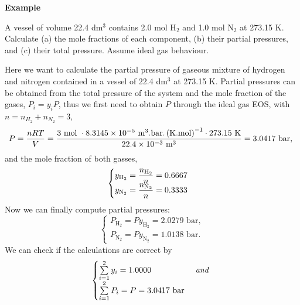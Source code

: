    \begin{MyExample}{\begin{center}{\bf Example}\end{center}}
     \begin{example}\label{Chapter:Intro_Property_of_Gases:Example5}
       \citep{Atkins_Book} A vessel of volume 22.4 dm$^{3}$ contains 2.0 mol H$_{2}$ and 1.0 mol N$_{2}$ at 273.15 K. Calculate (a) the mole fractions of each component, (b) their partial pressures, and (c) their total pressure. Assume ideal gas behaviour.
     \end{example}

        Here we want to calculate the partial pressure of gaseous mixture of hydrogen and nitrogen contained in a vessel of 22.4 dm$^{3}$ at 273.15 K. Partial pressures can be obtained from the total pressure of the system and the mole fraction of the gases, $P_{i}=y_{i}P$, thus we first need to obtain $P$ through the ideal gas EOS, with $n=n_{H_{2}}+n_{N_{2}}=3$,
      \begin{displaymath}
        P = \frc{n R T }{V} = \frc{3\text{ mol } \cdot 8.3145\times 10^{-5}\text{ m}^{3}\text{.bar.}\left(\text{K.mol}\right)^{-1}\cdot 273.15\text{ K}}{22.4\times 10^{-3}\text{ m}^{3}} = 3.0417\text{ bar, }
      \end{displaymath}
      and the mole fraction of both gasses,
       \begin{displaymath}
         \begin{cases}
           y_{\text{H}_{2}} = \frc{n_{\text{H}_{2}}}{n} = 0.6667  \\
           y_{\text{N}_{2}} = \frc{n_{\text{N}_{2}}}{n} = 0.3333  
         \end{cases}
       \end{displaymath}
       Now we can finally compute partial pressures:
       \begin{displaymath}
         \begin{cases}
           P_{\text{H}_{2}} = Py_{\text{H}_{2}} = 2.0279\text{ bar},  \\
           P_{\text{N}_{2}} = Py_{\text{N}_{2}} = 1.0138\text{ bar}.
         \end{cases}
       \end{displaymath}
       We can check if the calculations are correct by
       \begin{displaymath}
         \begin{cases}
           \summation[y_{i}]{i=1}{2} = 1.0000  & \textit{ and } \\
           \summation[P_{i}]{i=1}{2} = P = 3.0417\text{ bar} & \\
         \end{cases}
       \end{displaymath}
   \end{MyExample}




